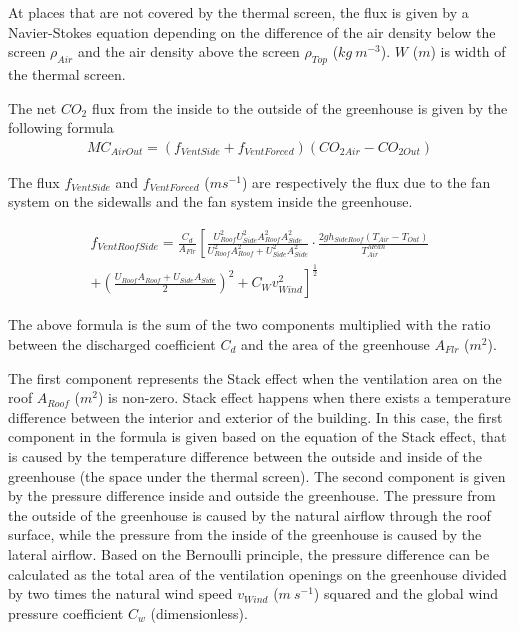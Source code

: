 \documentclass[a4paper]{article}
\numberwithin{equation}{section}
\begin{document}
At places that are not covered by the thermal screen, the flux is given by a Navier-Stokes equation depending on the difference of the air density below the screen \(\rho_{Air}\) and the air density above the screen \(\rho_{Top}\) (\(kg\ m^{-3}\)). \(W\) (\(m\)) is width of the thermal screen.

The net \(CO_2\) flux from the inside to the outside of the greenhouse is given by the following formula
\begin{align}
  MC_{AirOut} = (f_{VentSide} + f_{VentForced})(CO_{2 Air} - CO_{2 Out})
\end{align}

The flux \(f_{VentSide}\) and \(f_{VentForced}\) (\(m s^{-1}\)) are respectively the flux due to the fan system on the sidewalls and the fan system inside the greenhouse.


\begin{multline}
  \label{eq:vent_roof_side}
  f_{VentRoofSide} = \frac{C_d}{A_{Flr}} \left[\frac{U_{Roof}^2 U_{Side}^2 A_{Roof}^2 A_{Side}^2}{U_{Roof}^2 A_{Roof}^2 + U_{Side}^2 A_{Side}^2} \cdot \frac{2gh_{SideRoof} (T_{Air} - T_{Out})}{T_{Air}^{Mean}}\right. \\
  + \left.{ \left(\frac{U_{Roof} A_{Roof} + U_{Side} A_{Side}}{2}\right)}^2 + C_W v_{Wind}^2\right]^{\frac{1}{2}}
\end{multline}

The above formula is the sum of the two components multiplied with the ratio between the discharged coefficient \(C_d\) and the area of the greenhouse \(A_{Flr}\) (\(m^2\)).

The first component represents the Stack effect when the ventilation area on the roof \(A_{Roof}\) (\(m^2\)) is non-zero. Stack effect happens when there exists a temperature difference between the interior and exterior of the building. In this case, the first component in the formula is given based on the equation of the Stack effect, that is caused by the temperature difference between the outside and inside of the greenhouse (the space under the thermal screen).
The second component is given by the pressure difference inside and outside the greenhouse. The pressure from the outside of the greenhouse is caused by the natural airflow through the roof surface, while the pressure from the inside of the greenhouse is caused by the lateral airflow. Based on the Bernoulli principle, the pressure difference can be calculated as the total area of the ventilation openings on the greenhouse divided by two times the natural wind speed \(v_{Wind}\) (\(m\ s^{-1}\)) squared and the global wind pressure coefficient \(C_w\) (dimensionless).
\end{document}
